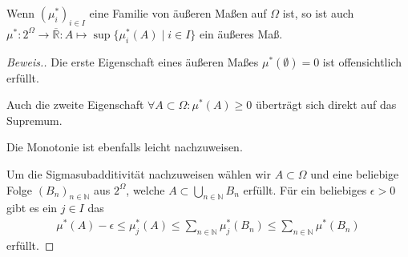 \begin{lemma}
    Wenn $(\mu_i^*)_{i\in I}$ eine Familie von äußeren Maßen auf $\Omega$ ist, so ist auch $\mu^*:2^\Omega\rightarrow\overline{\mathbb{R}}:A\mapsto\sup\{\mu_i^*(A)\mid i\in I\}$ ein äußeres Maß.
\end{lemma}
\begin{proof}[Beweis.]
    Die erste Eigenschaft eines äußeren Maßes $\mu^*(\emptyset)=0$ ist offensichtlich erfüllt.

    Auch die zweite Eigenschaft $\forall A\subset\Omega:\mu^*(A)\geq 0$ überträgt sich direkt auf das Supremum.

    Die Monotonie ist ebenfalls leicht nachzuweisen.

    Um die Sigmasubadditivität nachzuweisen wählen wir $A\subset\Omega$ und eine beliebige Folge $(B_n)_{n\in\mathbb{N}}$ aus $2^\Omega$, welche $A\subset\bigcup_{n\in\mathbb{N}}B_n$ erfüllt. Für ein beliebiges $\epsilon>0$ gibt es ein $j\in I$ das
    \begin{align*}
        \mu^*(A)-\epsilon\leq\mu_j^*(A)\leq\sum_{n\in\mathbb{N}}\mu_j^*(B_n)\leq\sum_{n\in\mathbb{N}}\mu^*(B_n)
    \end{align*}
    erfüllt.
\end{proof}